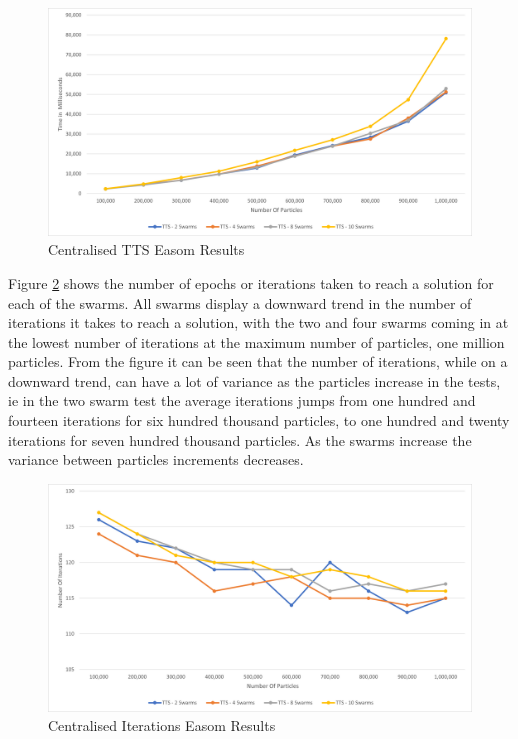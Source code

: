 \documentclass[oneside,12pt]{book}
\begin{document}
\begin{figure}[H]
    \centering
    \includegraphics[scale=0.45]{Images/Graphs/CentralisedEasomTTS.png}
    \caption{Centralised TTS Easom Results}
    \label{fig:Centralised_TTS_Easom_Results}
\end{figure}

Figure \ref{fig:Centralised_Epoc_Easom_Results} shows the number of epochs or iterations taken to reach a solution for each of the swarms. All swarms display a downward trend in the number of iterations it takes to reach a solution, with the two and four swarms coming in at the lowest number of iterations at the maximum number of particles, one million particles. From the figure it can be seen that the number of iterations, while on a downward trend, can have a lot of variance as the particles increase in the tests, ie in the two swarm test the average iterations jumps from one hundred and fourteen iterations for six hundred thousand particles, to one hundred and twenty iterations for seven hundred thousand particles. As the swarms increase the variance between particles increments decreases. 

\begin{figure}[H]
    \centering
    \includegraphics[scale=0.45]{Images/Graphs/CentralisedEasomEpoch.png}
    \caption{Centralised Iterations Easom Results}
    \label{fig:Centralised_Epoc_Easom_Results}
\end{figure}
\end{document}
